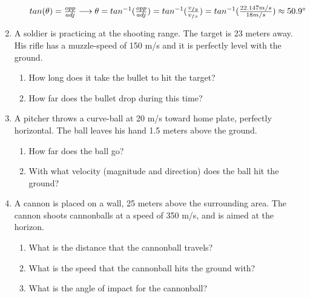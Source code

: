 \documentclass[letterpaper, 12pt]{article}
\begin{document}
\begin{enumerate}
\begin{enumerate}
	\color{red}
	$tan(\theta) = \frac{opp}{adj} \longrightarrow \theta = tan^{-1}(\frac{opp}{adj}) = tan^{-1}(\frac{v_{fy}}{v_{fx}}) =  tan^{-1}(\frac{22.147 m/s}{18 m/s}) \approx 50.9 \degree  $
	\color{black}
	\vspace{.1in}
	
\end{enumerate}

\item A soldier is practicing at the shooting range. The target is 23 meters away.  His rifle has a muzzle-speed of 150 m/s and it is perfectly level with the ground.
\begin{enumerate}
	\item How long does it take the bullet to hit the target?
	\vspace{0.5in}
	\item How far does the bullet drop during this time?
	\vspace{0.5in}
\end{enumerate}

\item  A pitcher throws a curve-ball at 20 m/s toward home plate, perfectly horizontal.  The ball leaves his hand 1.5 meters above the ground.  
\begin{enumerate}
	\item How far does the ball go?
	\vspace{0.5in}
	\item With what velocity (magnitude and direction) does the ball hit the ground?
	\vspace{0.7in}
\end{enumerate}


\item A cannon is placed on a wall, 25 meters above the surrounding area.  The cannon shoots cannonballs at a speed of 350 m/s, and is aimed at the horizon.  
\begin{enumerate}
	\item What is the distance that the cannonball travels?
	\vspace{0.5in}
	\item What is the speed that the cannonball hits the ground with?
	\vspace{0.5in}
	\item What is the angle of impact for the cannonball?	
	\vspace{0.5in}
\end{enumerate}



\end{enumerate}
\end{document}
